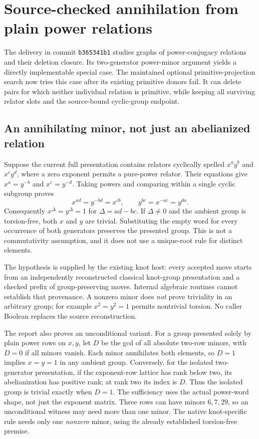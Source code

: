 \section{Source-checked annihilation from plain power relations}
\label{sec:power-pairs}

The delivery  in commit
\texttt{b365341b1} studies graphs of power-conjugacy relations and their
deletion closure. Its two-generator power-minor argument yields a directly
implementable special case. The maintained optional primitive-projection
search now tries this case after its existing primitive donors fail. It can
delete pairs for which neither individual relation is primitive, while keeping
all surviving relator slots and the source-bound cyclic-group endpoint.

\subsection{An annihilating minor, not just an abelianized relation}

Suppose the current full presentation contains relators cyclically spelled
$x^a y^b$ and $x^c y^d$, where a zero exponent permits a pure-power relator.
Their equations give $x^a=y^{-b}$ and $x^c=y^{-d}$. Taking powers and comparing
within a single cyclic subgroup proves
\[
 x^{ad}=y^{-bd}=x^{cb},\qquad
 y^{bc}=x^{-ac}=y^{da}.
\]
Consequently $x^\Delta=y^\Delta=1$ for $\Delta=ad-bc$. If $\Delta\ne0$
and the ambient group is torsion-free, both $x$ and $y$ are trivial.
Substituting the empty word for every occurrence of both generators preserves
the presented group. This is not a commutativity assumption, and it does not
use a unique-root rule for distinct elements.

The hypothesis is supplied by the existing knot host: every accepted move
starts from an independently reconstructed classical knot-group presentation
and a checked prefix of group-preserving moves. Internal algebraic routines
cannot establish that provenance. A nonzero minor does \emph{not} prove
triviality in an arbitrary group; for example $x^2=y^2=1$ permits nontrivial
torsion. No caller Boolean replaces the source reconstruction.

The report also proves an unconditional variant. For a group presented solely
by plain power rows on $x,y$, let $D$ be the gcd of all absolute two-row minors,
with $D=0$ if all minors vanish. Each minor annihilates both elements, so
$D=1$ implies $x=y=1$ in any ambient group. Conversely, for the isolated
two-generator presentation, if the exponent-row lattice has rank below two,
its abelianization has positive rank; at rank two its index is $D$. Thus the
isolated group is trivial exactly when $D=1$. The sufficiency uses the actual
power-word shape, not just the exponent matrix. Three rows can have minors
$6,7,29$, so an unconditional witness may need more than one minor.
The native knot-specific rule needs only one \emph{nonzero} minor, using its
already established torsion-free premise.

